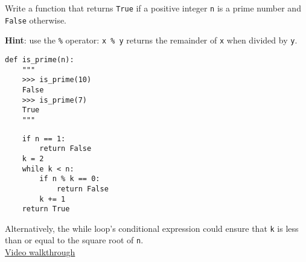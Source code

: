 \question Write a function that returns \lstinline$True$ if a positive integer \texttt{n} is
a prime number and \lstinline$False$ otherwise. 


\textbf{Hint}: use the \lstinline$%$ operator: \lstinline$x % y$ returns
the remainder of \lstinline$x$ when divided by \lstinline$y$.

\begin{lstlisting}
def is_prime(n):
    """
    >>> is_prime(10)
    False
    >>> is_prime(7)
    True
    """
\end{lstlisting}

\begin{solution}[2in]
\begin{lstlisting}
    if n == 1:
        return False
    k = 2
    while k < n:
        if n % k == 0:
            return False
        k += 1
    return True
\end{lstlisting}

Alternatively, the while loop's conditional expression could ensure that
\lstinline$k$ is less than or equal to the square root of \lstinline$n$.\\
\href{https://www.youtube.com/watch?v=_EsWkCytavI&list=PLx38hZJ5RLZfg6jvEBBtjc5fnc5BclyEb&index=2}{Video walkthrough}
\end{solution}
